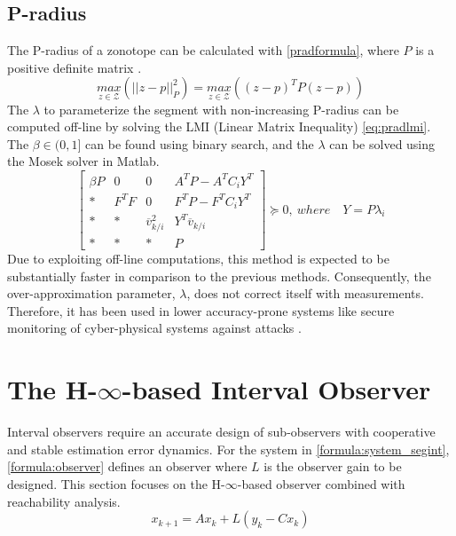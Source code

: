 \subsection{P-radius}
The P-radius of a zonotope can be calculated with \eqref{pradformula}, where $P$ is a positive definite matrix \cite{Alamo2005}.
\begin{equation}
\label{pradformula}
\underset{z \in \mathcal{Z}}{max} (||z - p||^2_{P}) = \underset{z \in \mathcal{Z}}{max}((z-p)^T P (z-p))
\end{equation}
The $\lambda$ to parameterize the segment with non-increasing P-radius can be computed off-line by solving the LMI (Linear Matrix Inequality) \eqref{eq:pradlmi}. The $\beta \in (0,1]$ can be found using binary search, and the $\lambda$ can be solved using the Mosek solver in Matlab\textsuperscript{\tiny\textregistered}.
\begin{equation}
\label{eq:pradlmi}
\left[
\begin{matrix}
\beta P & 0 & 0 & A^TP - A^TC_iY^T\\
* & F^TF & 0 & F^TP -F^TC_iY^T\\
* & * & \overline{v}_{k/i}^2 & Y^T\overline{v}_{k/i}\\
* & * & * & P
\end{matrix}\right] \succeq 0,
~where\quad Y = P\lambda_i
\end{equation}
Due to exploiting off-line computations, this method is expected to be substantially faster in comparison to the previous methods. Consequently, the over-approximation parameter, $\lambda$, does not correct itself with measurements. Therefore, it has been used in lower accuracy-prone systems like secure monitoring of cyber-physical systems against attacks \cite{GE20201592}. 

\section{The H-$\infty$-based Interval Observer}
Interval observers require an accurate design of sub-observers with cooperative and stable estimation error dynamics. For the system in \eqref{formula:system_segint}, \eqref{formula:observer} defines an observer where $L$ is the observer gain to be designed. This section focuses on the H-$\infty$-based observer combined with reachability analysis.
\begin{equation}
\label{formula:observer}
x_{k+1} = Ax_k + L(y_k -Cx_k)
\end{equation}


